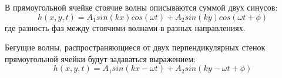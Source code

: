 В прямоугольной ячейке стоячие волны описываются суммой двух синусов:
\begin{equation}
\label{eq:waveStand}
h(x, y, t) = A_1 sin(kx)cos(\omega t)+A_2 sin(ky)cos(\omega t+ \phi)
\end{equation}
где \phi разность фаз между стоячими волнами в разных направлениях.

Бегущие волны, распространяющиеся от двух перпендикулярных стенок прямоугольной ячейки будут задаваться выражением:
\begin{equation}
\label{eq:waveRun}
h(x, y, t) = A_1 sin(kx-\omega t)+A_2 sin(ky-\omega t+ \phi)
\end{equation}





